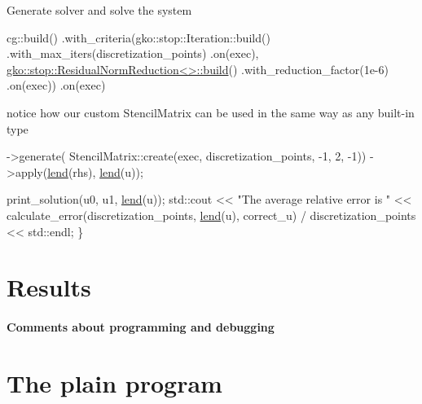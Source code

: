 Generate solver and solve the system


\begin{DoxyCode}
cg::build()
    .with\_criteria(gko::stop::Iteration::build()
                       .with\_max\_iters(discretization\_points)
                       .on(exec),
                   \hyperlink{classgko_1_1stop_1_1ResidualNormReduction}{gko::stop::ResidualNormReduction<>::build}()
                       .with\_reduction\_factor(1e-6)
                       .on(exec))
    .on(exec)
\end{DoxyCode}


notice how our custom Stencil\+Matrix can be used in the same way as any built-\/in type


\begin{DoxyCode}
        ->generate(
            StencilMatrix::create(exec, discretization\_points, -1, 2, -1))
        ->apply(\hyperlink{namespacegko_aa8cb4876b72e5e1036ea9575443c439b}{lend}(rhs), \hyperlink{namespacegko_aa8cb4876b72e5e1036ea9575443c439b}{lend}(u));

    print\_solution(u0, u1, \hyperlink{namespacegko_aa8cb4876b72e5e1036ea9575443c439b}{lend}(u));
    std::cout << \textcolor{stringliteral}{"The average relative error is "}
              << calculate\_error(discretization\_points, \hyperlink{namespacegko_aa8cb4876b72e5e1036ea9575443c439b}{lend}(u), correct\_u) /
                     discretization\_points
              << std::endl;
\}
\end{DoxyCode}
 \label{_Results}%
\section*{Results}

\label{_Commentsaboutprogramminganddebugging}%
\paragraph*{Comments about programming and debugging }

\label{_PlainProg}%
 \section*{The plain program}


